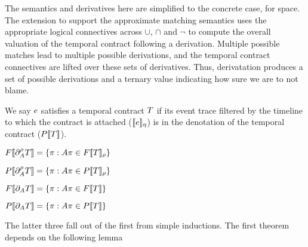 The semantics and derivatives here are simplified to the concrete case, for space.
%
The extension to support the approximate matching semantics uses the appropriate logical connectives across $\cup$, $\cap$ and $\neg$ to compute the overall valuation of the temporal contract following a derivation.
%
Multiple possible matches lead to multiple possible derivations, and the temporal contract connectives are lifted over these sets of derivatives.
%
Thus, derivatation produces a set of possible derivations and a ternary value indicating how sure we are to not blame.

We say $e$ satisfies a temporal contract $T$ if its event trace filtered by the timeline to which the contract is attached ($[\![ e ]\!]_\eta$) is in the denotation of the temporal contract ($P[\![ T ]\!]$).
%

\begin{theorem}[Full]
 $F[\![ \partial_{A}^{\rho}{T} ]\!] = \left\{\pi : A\pi \in F[\![ T ]\!]_{\rho}\right\}$
\end{theorem}

\begin{theorem}[Partial]
 $P[\![ \partial_{A}^{\rho}{T} ]\!] = \left\{\pi : A\pi \in P[\![ T ]\!]_{\rho}\right\}$
\end{theorem}

\begin{theorem}
 $F[\![ \partial_{A}{T} ]\!] = \left\{\pi : A\pi \in F[\![ T ]\!]\right\}$
\end{theorem}

\begin{theorem}
 $P[\![ \partial_{A}{T} ]\!] = \left\{\pi : A\pi \in P[\![ T ]\!]\right\}$
\end{theorem}

The latter three fall out of the first from simple inductions.
%
The first theorem depends on the following lemma

